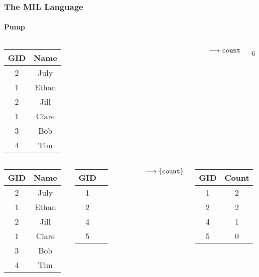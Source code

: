 \documentclass{beamer}
\begin{document}
\begin{frame}
  \frametitle{The MIL Language}
  \framesubtitle{Pump}

  \begin{columns}

  \column{1cm}

  \begin{tabular}{|c|c|}
    \hline
    GID & Name \\
    \hline
    2 & July \\
    1 & Ethan \\
    2 & Jill \\
    1 & Clare \\
    3 & Bob \\
    4 & Tim \\
    \hline
  \end{tabular}

  \column{1cm}

  $\longrightarrow{\tt count}$

  \column{1cm}

  6

  \end{columns}

  \pause

  \begin{columns}

  \column{1cm}

  \begin{tabular}{|c|c|}
    \hline
    GID & Name \\
    \hline
    2 & July \\
    1 & Ethan \\
    2 & Jill \\
    1 & Clare \\
    3 & Bob \\
    4 & Tim \\
    \hline
  \end{tabular}

  \column{1cm}

  \begin{tabular}{|c|c|}
    \hline
    GID & \\
    \hline
    1 & \\
    2 & \\
    4 & \\
    5 & \\
    \hline
  \end{tabular}

  \column{1cm}

  $\longrightarrow{\tt \lbrace{}count\rbrace}$

  \column{1cm}

  \begin{tabular}{|c|c|}
    \hline
    GID & Count \\
    \hline
    1 & 2 \\
    2 & 2 \\
    4 & 1 \\
    5 & 0 \\
    \hline
  \end{tabular}

  \end{columns}

\end{frame}
\end{document}
